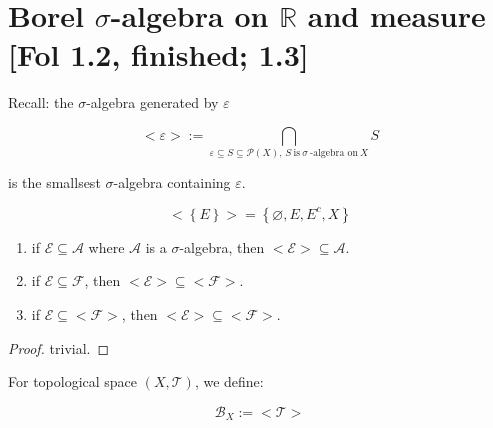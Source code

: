 \section{\texorpdfstring{Borel \(\sigma\)-algebra on \(\mathbb{R}\) and measure {[}Fol 1.2, finished; 1.3{]}}{Borel \textbackslash sigma-algebra on \textbackslash mathbb\{R\} and measure {[}Fol 1.2, finished; 1.3{]}}}

Recall: the \(\sigma\)-algebra generated by \(\varepsilon\)

\[< \varepsilon > := \bigcap\limits_{\varepsilon \subseteq S \subseteq \mathcal{P}(X),\, S\ \text{is}\ \sigma\ \text{-algebra on}\ X}S\]

is the smallsest \(\sigma\)-algebra containing \(\varepsilon\).

\begin{example}

\[< \left\{ E \right\} > = \left\{ {\varnothing,E,E^{c},X} \right\}\]

\end{example}

\begin{lemma}{}\label{lem-01-sigma-algebra-measure-inclusion-properties-of-generated-sigma-algebra}

\begin{enumerate}
\item
  if \(\mathcal{E} \subseteq \mathcal{A}\) where \(\mathcal{A}\) is a \(\sigma\)-algebra, then \(< \mathcal{E} > \subseteq \mathcal{A}\).
\item
  if \(\mathcal{E} \subseteq \mathcal{F}\), then \(< \mathcal{E} > \subseteq < \mathcal{F} >\).
\item
  if \(\mathcal{E} \subseteq < \mathcal{F} >\), then \(< \mathcal{E} > \subseteq < \mathcal{F} >\).
\end{enumerate}

\end{lemma}

\begin{proof}

trivial.

\end{proof}

\begin{definition}{}

For topological space \((X,\mathcal{T})\), we define:

\[\mathcal{B}_{X} := < \mathcal{T} >\]

\end{definition}

